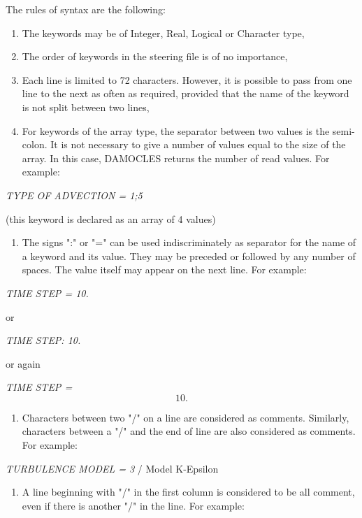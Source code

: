  The rules of syntax are the following:

\begin{enumerate}
\item  The keywords may be of Integer, Real, Logical or Character type,

\item  The order of keywords in the steering file is of no importance,

\item  Each line is limited to 72 characters. However, it is possible to pass from one line to the next as often as required, provided that the name of the keyword is not split between two lines,

\item  For keywords of the array type, the separator between two values is the semi-colon. It is not necessary to give a number of values equal to the size of the array. In this case, DAMOCLES returns the number of read values. For example:
\end{enumerate}

 \textit{TYPE OF ADVECTION = 1;5}

 (this keyword is declared as an array of 4 values)

\begin{enumerate}
\item  The signs ":" or "=" can be used indiscriminately as separator for the name of a keyword and its value. They may be preceded or followed by any number of spaces. The value itself may appear on the next line. For example:
\end{enumerate}

 \textit{TIME STEP =   10. }

or

 \textit{TIME STEP: 10.}

or again

 \textit{TIME STEP =}
\[10.\]

\begin{enumerate}
\item \textit{ }Characters between two "/" on a line are considered as comments. Similarly, characters between a "/" and the end of line are also considered as comments. For example:
\end{enumerate}

 \textit{TURBULENCE MODEL = 3}     / Model K-Epsilon

\begin{enumerate}
\item  A line beginning with "/" in the first column is considered to be all comment, even if there is another "/" in the line. For example:
\end{enumerate}

